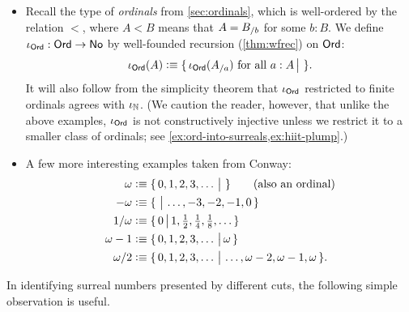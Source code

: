 \begin{itemize}
  \begin{align*}
    \iota_{\RD}(x) &\defeq
    \surr{q\in\Q_D \text{ such that } q<x}{q\in\Q_D \text{ such that } x<q}.
  \end{align*}
  Unlike in the previous cases, it is not obvious that this extends $\iota_{\Q_D}$ when we regard dyadic rationals as Dedekind reals.
  This follows from the simplicity theorem (\cref{thm:NO-simplicity}).
\item Recall the type \ord of \emph{ordinals} from \cref{sec:ordinals}, which is well-ordered by the relation $<$, where $A<B$ means that $A = {B}_{/b}$ for some $b:B$.
  We define $\iota_{\mathsf{Ord}}:\mathsf{Ord}\to\mathsf{No}$\label{ord-into-surreals} by well-founded recursion (\cref{thm:wfrec}) on $\mathsf{Ord}$:
  \begin{equation*}
    \iota_{\mathsf{Ord}}(A) \vcentcolon\equiv
    \{\,\iota_\mathsf{Ord}({A}_{/a}) \text{ for all } a:A\,\big|\,\,\}.
  \end{equation*}
  It will also follow from the simplicity theorem that $\iota_\mathsf{Ord}$ restricted to finite ordinals agrees with $\iota_\mathbb{N}$.
  (We caution the reader, however, that unlike the above examples, $\iota_\mathsf{Ord}$ is not constructively injective unless we restrict it to a smaller class of ordinals; see \cref{ex:ord-into-surreals,ex:hiit-plump}.)
\item A few more interesting examples taken from Conway:
  \begin{align*}
    \omega &\vcentcolon\equiv \{\,0,1,2,3,\dots\,\big|\,\,\} \qquad\text{(also an ordinal)}\\
    -\omega &\vcentcolon\equiv \{\,\,\big|\,\dots,-3,-2,-1,0\,\}\\
    1/\omega &\vcentcolon\equiv \textstyle\{\,0\,\big|\,1,\frac12,\frac14,\frac18,\dots\,\}\\
    \omega-1 &\vcentcolon\equiv \{\,0,1,2,3,\dots\,\big|\,\omega\,\}\\
    \omega/2 &\vcentcolon\equiv \{\,0,1,2,3,\dots\,\big|\,\dots,\omega-2,\omega-1,\omega\,\}.
  \end{align*}
\end{itemize}

In identifying surreal numbers presented by different cuts, the following simple observation is useful.

